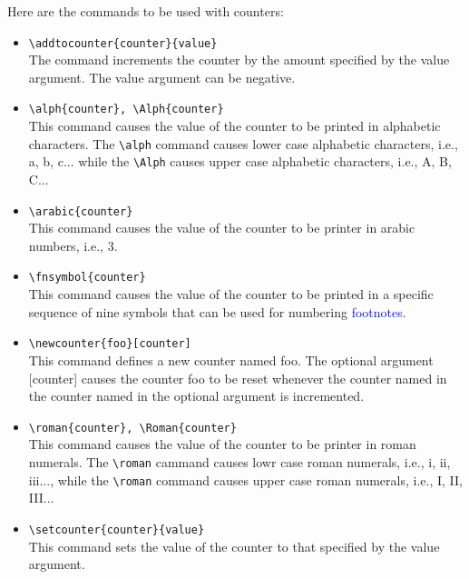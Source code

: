 Here are the commands to be used with counters:
\begin{itemize}
	\item \lstinline[language={[LaTeX]TeX}]|\addtocounter{counter}{value}|\\
	The command increments the counter by the amount specified by the value argument. The value argument can be negative.
	
	\item \lstinline[language={[LaTeX]TeX}]|\alph{counter}, \Alph{counter}|\\
	This command causes the value of the counter to be printed in alphabetic characters. The \lstinline[language={[LaTeX]TeX}]|\alph| command causes lower case alphabetic characters, i.e., a, b, c... while the \lstinline[language={[LaTeX]TeX}]|\Alph| causes upper case alphabetic characters, i.e., A, B, C...
	
	\item \lstinline[language={[LaTeX]TeX}]|\arabic{counter}|\\
	This command causes the value of the counter to be printer in arabic numbers, i.e., 3.
	
	\item \lstinline[language={[LaTeX]TeX}]|\fnsymbol{counter}|\\
	This command causes the value of the counter to be printed in a specific sequence of nine symbols that can be used for numbering \textcolor{blue}{footnotes}.
	
	\item \lstinline[language={[LaTeX]TeX}]|\newcounter{foo}[counter]|\\
	This command defines a new counter named foo. The optional argument [counter] causes the counter foo to be reset whenever the counter named in the counter named in the optional argument is incremented.
	
	\item \lstinline[language={[LaTeX]TeX}]|\roman{counter}, \Roman{counter}|\\
	This command causes the value of the counter to be printer in roman numerals. The \lstinline[language={[LaTeX]TeX}]|\roman| cammand causes lowr case roman numerals, i.e., i, ii, iii..., while the \lstinline[language={[LaTeX]TeX}]|\roman| command causes upper case roman numerals, i.e., I, II, III...
	
	\item \lstinline[language={[LaTeX]TeX}]|\setcounter{counter}{value}|\\
	This command sets the value of the counter to that specified by the value argument.
	

\end{itemize}

